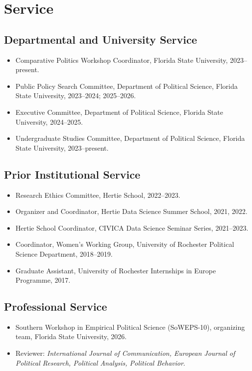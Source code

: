 \documentclass[10pt]{article}
\begin{document}
\section{Service}

\subsection{Departmental and University Service}
\begin{itemize}
    \item Comparative Politics Workshop Coordinator, Florida State University, 2023--present.
    \item Public Policy Search Committee, Department of Political Science, Florida State University, 2023--2024; 2025--2026.
    \item Executive Committee, Department of Political Science, Florida State University, 2024--2025.
    \item Undergraduate Studies Committee, Department of Political Science, Florida State University, 2023--present.
\end{itemize}

\subsection{Prior Institutional Service}
\begin{itemize}
    \item Research Ethics Committee, Hertie School, 2022--2023.
    \item Organizer and Coordinator, Hertie Data Science Summer School, 2021, 2022.
    \item Hertie School Coordinator, CIVICA Data Science Seminar Series, 2021--2023.
    \item Coordinator, Women's Working Group, University of Rochester Political Science Department, 2018--2019.
    \item Graduate Assistant, University of Rochester Internships in Europe Programme, 2017.
\end{itemize}

\subsection{Professional Service}
\begin{itemize}
    \item Southern Workshop in Empirical Political Science (SoWEPS-10), organizing team, Florida State University, 2026.
     \item Reviewer: \textit{International Journal of Communication, European Journal of Political Research, Political Analysis, Political Behavior}.
\end{itemize}
\end{document}
